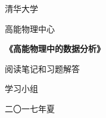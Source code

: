 
\begin{titlepage}
\centering
{\Large
清华大学\par
高能物理中心\par
}
\vspace{18ex}
{\Huge\bfseries
《高能物理中的数据分析》\par 阅读笔记和习题解答\par
}
\vspace{6ex}
{\Large
学习小组
\par}
\vfill
\parbox{.5\textwidth}{\centering 二〇一七年夏}
\end{titlepage}

